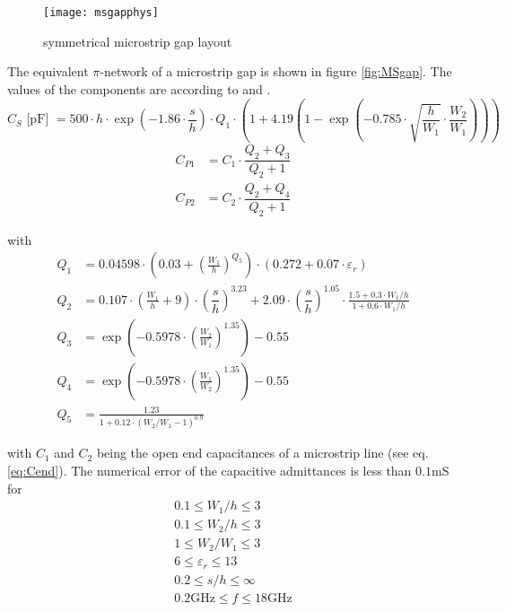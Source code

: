 \begin{figure}[ht]
\begin{center}
\texttt{[image: msgapphys]}
\end{center}
\caption{symmetrical microstrip gap layout}
\label{fig:MSgaPhys}
\end{figure}
\FloatBarrier

The equivalent $\pi$-network of a microstrip gap is shown in figure
\ref{fig:MSgap}.  The values of the components are according to
\cite{Kirschning8} and \cite{Kirschning4}.
\begin{equation}
C_S \textrm{ [pF] } = 500\cdot h\cdot\exp\left( -1.86\cdot\dfrac{s}{h} \right)\cdot Q_1\cdot
       \left( 1 + 4.19\left( 1 - \exp\left( -0.785\cdot\sqrt{\dfrac{h}{W_1}}\cdot
       \dfrac{W_2}{W_1} \right) \right) \right)
\end{equation}
\begin{align}
C_{P1} &= C_1\cdot \dfrac{Q_2+Q_3}{Q_2+1}\\
C_{P2} &= C_2\cdot \dfrac{Q_2+Q_4}{Q_2+1}
\end{align}

with
\begin{align}
Q_1 &= 0.04598\cdot \left( 0.03 + \left(\frac{W_1}{h}\right)^{Q_5} \right)\cdot
      (0.272 + 0.07\cdot\varepsilon_r)\\
Q_2 &= 0.107\cdot\left( \frac{W_1}{h}+9 \right) \cdot \left( \dfrac{s}{h} \right)^{3.23}
    + 2.09 \cdot \left( \dfrac{s}{h} \right)^{1.05}\cdot
    \frac{1.5+0.3\cdot W_1/h}{1+0.6\cdot W_1/h}\\
Q_3 &= \exp\left( -0.5978\cdot \left( \frac{W_2}{W_1} \right)^{1.35} \right) - 0.55\\
Q_4 &= \exp\left( -0.5978\cdot \left( \frac{W_1}{W_2} \right)^{1.35} \right) - 0.55\\
Q_5 &= \frac{1.23}{1 + 0.12\cdot \left( W_2 / W_1 - 1 \right)^{0.9}}
\end{align}

with $C_1$ and $C_2$ being the open end capacitances of a microstrip
line (see eq. \eqref{eq:Cend}).  The numerical error of the
capacitive admittances is less than $0.1$mS for
\begin{equation*}
\begin{split}
0.1\le W_1/h \le 3 \\
0.1\le W_2/h \le 3 \\
1\le W_2/W_1 \le 3 \\
6\le \varepsilon_r \le 13 \\
0.2\le s/h \le \infty \\
0.2\text{GHz} \le f \le 18\text{GHz}
\end{split}
\end{equation*}

